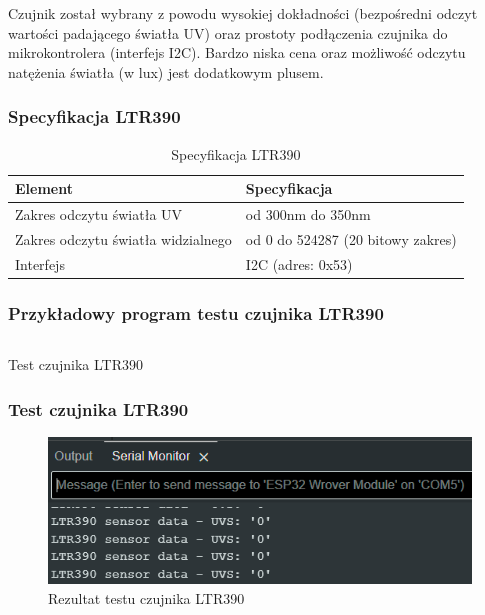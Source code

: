 \documentclass[12pt,a4paper]{article}
\begin{document}
Czujnik został wybrany z powodu wysokiej dokładności (bezpośredni odczyt wartości padającego światła UV) oraz prostoty podłączenia czujnika do mikrokontrolera (interfejs I2C). 
Bardzo niska cena oraz możliwość odczytu natężenia światła (w lux) jest dodatkowym plusem.

\subsubsection{Specyfikacja LTR390}

\begin{table}[H]
    \centering
    \begin{tabular}{|l|l|}
        \hline
        Element & Specyfikacja \\
        \hline
        Zakres odczytu światła UV & od 300nm do 350nm \\
        \hline
        Zakres odczytu światła widzialnego & od 0 do 524287 (20 bitowy zakres) \\
        \hline
        Interfejs & I2C (adres: 0x53) \\
        \hline
    \end{tabular}
    \caption{Specyfikacja LTR390}
    \label{ltr390-spec}
\end{table}

\subsubsection{Przykładowy program testu czujnika LTR390}
\begin{code}[H]
\inputminted[frame=lines,baselinestretch=1,breaklines,linenos,xleftmargin=1.5em]{c}{../proj/ltr390-test/ltr390-test.ino}

\caption{Test czujnika LTR390}
\end{code}

\subsubsection{Test czujnika LTR390}
\begin{figure}[H]
    \centering
    \includegraphics[width=\textwidth]{ltr390-test.png}
    \caption{Rezultat testu czujnika LTR390}
\end{figure}
\end{document}
